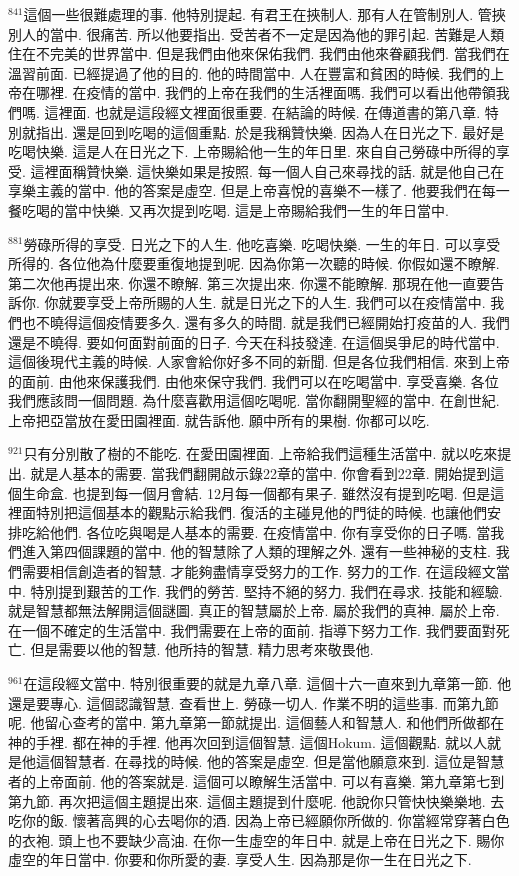 \documentclass{book}
\begin{document}
$^{841}$這個一些很難處理的事.
他特別提起.
有君王在挾制人.
那有人在管制別人.
管挾別人的當中.
很痛苦.
所以他要指出.
受苦者不一定是因為他的罪引起.
苦難是人類住在不完美的世界當中.
但是我們由他來保佑我們.
我們由他來眷顧我們.
當我們在溫習前面.
已經提過了他的目的.
他的時間當中.
人在豐富和貧困的時候.
我們的上帝在哪裡.
在疫情的當中.
我們的上帝在我們的生活裡面嗎.
我們可以看出他帶領我們嗎.
這裡面.
也就是這段經文裡面很重要.
在結論的時候.
在傳道書的第八章.
特別就指出.
還是回到吃喝的這個重點.
於是我稱贊快樂.
因為人在日光之下.
最好是吃喝快樂.
這是人在日光之下.
上帝賜給他一生的年日里.
來自自己勞碌中所得的享受.
這裡面稱贊快樂.
這快樂如果是按照.
每一個人自己來尋找的話.
就是他自己在享樂主義的當中.
他的答案是虛空.
但是上帝喜悅的喜樂不一樣了.
他要我們在每一餐吃喝的當中快樂.
又再次提到吃喝.
這是上帝賜給我們一生的年日當中.

$^{881}$勞碌所得的享受.
日光之下的人生.
他吃喜樂.
吃喝快樂.
一生的年日.
可以享受所得的.
各位他為什麼要重復地提到呢.
因為你第一次聽的時候.
你假如還不瞭解.
第二次他再提出來.
你還不瞭解.
第三次提出來.
你還不能瞭解.
那現在他一直要告訴你.
你就要享受上帝所賜的人生.
就是日光之下的人生.
我們可以在疫情當中.
我們也不曉得這個疫情要多久.
還有多久的時間.
就是我們已經開始打疫苗的人.
我們還是不曉得.
要如何面對前面的日子.
今天在科技發達.
在這個吳爭尼的時代當中.
這個後現代主義的時候.
人家會給你好多不同的新聞.
但是各位我們相信.
來到上帝的面前.
由他來保護我們.
由他來保守我們.
我們可以在吃喝當中.
享受喜樂.
各位我們應該問一個問題.
為什麼喜歡用這個吃喝呢.
當你翻開聖經的當中.
在創世紀.
上帝把亞當放在愛田園裡面.
就告訴他.
願中所有的果樹.
你都可以吃.

$^{921}$只有分別散了樹的不能吃.
在愛田園裡面.
上帝給我們這種生活當中.
就以吃來提出.
就是人基本的需要.
當我們翻開啟示錄22章的當中.
你會看到22章.
開始提到這個生命盒.
也提到每一個月會結.
12月每一個都有果子.
雖然沒有提到吃喝.
但是這裡面特別把這個基本的觀點示給我們.
復活的主碰見他的門徒的時候.
也讓他們安排吃給他們.
各位吃與喝是人基本的需要.
在疫情當中.
你有享受你的日子嗎.
當我們進入第四個課題的當中.
他的智慧除了人類的理解之外.
還有一些神秘的支柱.
我們需要相信創造者的智慧.
才能夠盡情享受努力的工作.
努力的工作.
在這段經文當中.
特別提到艱苦的工作.
我們的勞苦.
堅持不絕的努力.
我們在尋求.
技能和經驗.
就是智慧都無法解開這個謎圖.
真正的智慧屬於上帝.
屬於我們的真神.
屬於上帝.
在一個不確定的生活當中.
我們需要在上帝的面前.
指導下努力工作.
我們要面對死亡.
但是需要以他的智慧.
他所持的智慧.
精力思考來敬畏他.

$^{961}$在這段經文當中.
特別很重要的就是九章八章.
這個十六一直來到九章第一節.
他還是要專心.
這個認識智慧.
查看世上.
勞碌一切人.
作業不明的這些事.
而第九節呢.
他留心查考的當中.
第九章第一節就提出.
這個藝人和智慧人.
和他們所做都在神的手裡.
都在神的手裡.
他再次回到這個智慧.
這個Hokum.
這個觀點.
就以人就是他這個智慧者.
在尋找的時候.
他的答案是虛空.
但是當他願意來到.
這位是智慧者的上帝面前.
他的答案就是.
這個可以瞭解生活當中.
可以有喜樂.
第九章第七到第九節.
再次把這個主題提出來.
這個主題提到什麼呢.
他說你只管快快樂樂地.
去吃你的飯.
懷著高興的心去喝你的酒.
因為上帝已經願你所做的.
你當經常穿著白色的衣袍.
頭上也不要缺少高油.
在你一生虛空的年日中.
就是上帝在日光之下.
賜你虛空的年日當中.
你要和你所愛的妻.
享受人生.
因為那是你一生在日光之下.
\end{document}

